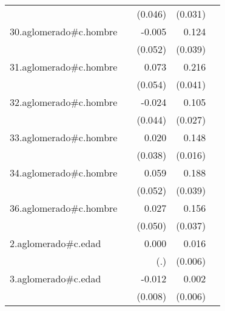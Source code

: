 {\begin{longtable}{l*{4}{D{.}{.}{-1}}}
            &                     &     (0.046)         &     (0.031)         &                     \\
\addlinespace
30.aglomerado#c.hombre&                     &      -0.005         &       0.124\sym{**} &                     \\
            &                     &     (0.052)         &     (0.039)         &                     \\
\addlinespace
31.aglomerado#c.hombre&                     &       0.073         &       0.216\sym{***}&                     \\
            &                     &     (0.054)         &     (0.041)         &                     \\
\addlinespace
32.aglomerado#c.hombre&                     &      -0.024         &       0.105\sym{***}&                     \\
            &                     &     (0.044)         &     (0.027)         &                     \\
\addlinespace
33.aglomerado#c.hombre&                     &       0.020         &       0.148\sym{***}&                     \\
            &                     &     (0.038)         &     (0.016)         &                     \\
\addlinespace
34.aglomerado#c.hombre&                     &       0.059         &       0.188\sym{***}&                     \\
            &                     &     (0.052)         &     (0.039)         &                     \\
\addlinespace
36.aglomerado#c.hombre&                     &       0.027         &       0.156\sym{***}&                     \\
            &                     &     (0.050)         &     (0.037)         &                     \\
\addlinespace
2.aglomerado#c.edad&                     &       0.000         &       0.016\sym{**} &                     \\
            &                     &         (.)         &     (0.006)         &                     \\
\addlinespace
3.aglomerado#c.edad&                     &      -0.012         &       0.002         &                     \\
            &                     &     (0.008)         &     (0.006)         &                     \\

\end{longtable}}
